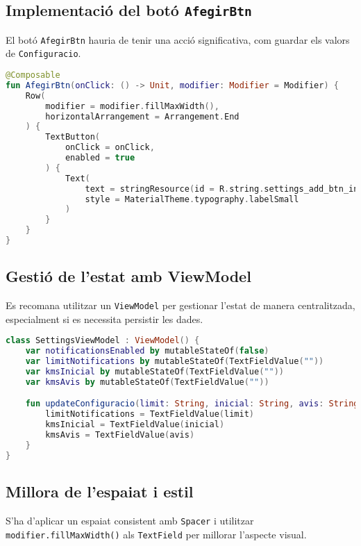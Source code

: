 \documentclass[a4paper,12pt]{article}
\begin{document}
\subsection{Implementació del botó \texttt{AfegirBtn}}
El botó \texttt{AfegirBtn} hauria de tenir una acció significativa, com guardar els valors de \texttt{Configuracio}.

\begin{lstlisting}[language=Kotlin]
@Composable
fun AfegirBtn(onClick: () -> Unit, modifier: Modifier = Modifier) {
    Row(
        modifier = modifier.fillMaxWidth(),
        horizontalArrangement = Arrangement.End
    ) {
        TextButton(
            onClick = onClick,
            enabled = true
        ) {
            Text(
                text = stringResource(id = R.string.settings_add_btn_interval),
                style = MaterialTheme.typography.labelSmall
            )
        }
    }
}
\end{lstlisting}

\subsection{Gestió de l'estat amb ViewModel}
Es recomana utilitzar un \texttt{ViewModel} per gestionar l'estat de manera centralitzada, especialment si es necessita persistir les dades.

\begin{lstlisting}[language=Kotlin]
class SettingsViewModel : ViewModel() {
    var notificationsEnabled by mutableStateOf(false)
    var limitNotifications by mutableStateOf(TextFieldValue(""))
    var kmsInicial by mutableStateOf(TextFieldValue(""))
    var kmsAvis by mutableStateOf(TextFieldValue(""))

    fun updateConfiguracio(limit: String, inicial: String, avis: String) {
        limitNotifications = TextFieldValue(limit)
        kmsInicial = TextFieldValue(inicial)
        kmsAvis = TextFieldValue(avis)
    }
}
\end{lstlisting}

\subsection{Millora de l'espaiat i estil}
S'ha d'aplicar un espaiat consistent amb \texttt{Spacer} i utilitzar \texttt{modifier.fillMaxWidth()} als \texttt{TextField} per millorar l'aspecte visual.
\end{document}
